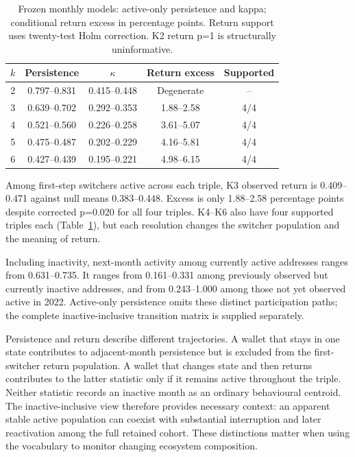 \documentclass[journal,letterpaper]{IEEEtran}
\begin{document}
\begin{table}[!t]
\centering\footnotesize
\caption{Frozen monthly models: active-only persistence and kappa; conditional return excess in percentage points. Return support uses twenty-test Holm correction. K2 return p=1 is structurally uninformative.}
\label{tab:monthlycomparison}
\begin{tabular}{rcccc}
\toprule
$k$ & Persistence & $\kappa$ & Return excess & Supported \\
\midrule
2 & 0.797--0.831 & 0.415--0.448 & Degenerate & -- \\
3 & 0.639--0.702 & 0.292--0.353 & 1.88--2.58 & 4/4 \\
4 & 0.521--0.560 & 0.226--0.258 & 3.61--5.07 & 4/4 \\
5 & 0.475--0.487 & 0.202--0.229 & 4.16--5.81 & 4/4 \\
6 & 0.427--0.439 & 0.195--0.221 & 4.98--6.15 & 4/4 \\
\bottomrule
\end{tabular}
\end{table}
Among first-step switchers active across each triple, K3 observed return is 0.409--0.471 against null means 0.383--0.448. Excess is only 1.88--2.58 percentage points despite corrected p=0.020 for all four triples. K4--K6 also have four supported triples each (Table~\ref{tab:monthlycomparison}), but each resolution changes the switcher population and the meaning of return.

Including inactivity, next-month activity among currently active addresses ranges from 0.631--0.735. It ranges from 0.161--0.331 among previously observed but currently inactive addresses, and from 0.243--1.000 among those not yet observed active in 2022. Active-only persistence omits these distinct participation paths; the complete inactive-inclusive transition matrix is supplied separately.

Persistence and return describe different trajectories. A wallet that stays in one state contributes to adjacent-month persistence but is excluded from the first-switcher return population. A wallet that changes state and then returns contributes to the latter statistic only if it remains active throughout the triple. Neither statistic records an inactive month as an ordinary behavioural centroid. The inactive-inclusive view therefore provides necessary context: an apparent stable active population can coexist with substantial interruption and later reactivation among the full retained cohort. These distinctions matter when using the vocabulary to monitor changing ecosystem composition.
\end{document}
